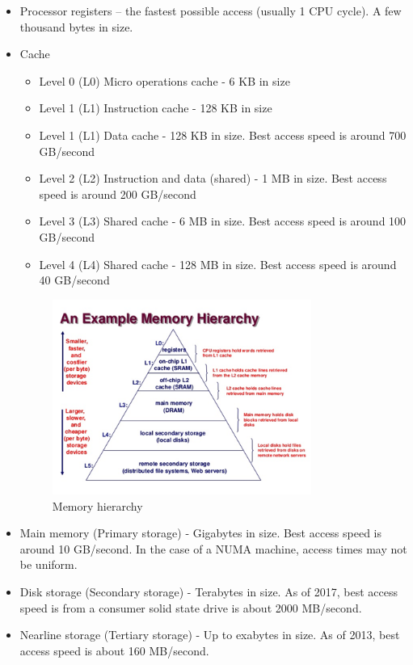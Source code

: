 \documentclass[11pt, conference, onecolumn]{IEEEtran}
\begin{document}
\begin{itemize}
	\item Processor registers – the fastest possible access (usually 1 CPU cycle). A few thousand bytes in size.
	\item Cache
		\begin{itemize}
			\item Level 0 (L0) Micro operations cache - 6 KB  in size
        			\item Level 1 (L1) Instruction cache - 128 KB in size
        			\item Level 1 (L1) Data cache - 128 KB in size. Best access speed is around 700 GB/second
        			\item Level 2 (L2) Instruction and data (shared) - 1 MB in size. Best access speed is around 200 GB/second
        			\item Level 3 (L3) Shared cache - 6 MB in size. Best access speed is around 100 GB/second
        			\item Level 4 (L4) Shared cache - 128 MB in size. Best access speed is around 40 GB/second
		\end{itemize}
\begin{figure}
		\begin{center}
		\includegraphics[width=0.8\textwidth]{memory.png}
		\caption {Memory hierarchy}
		\end{center}	
	\end{figure}
	\item Main memory (Primary storage) - Gigabytes in size. Best access speed is around 10 GB/second. In the case of a NUMA machine, access times may not be uniform.
	\item Disk storage (Secondary storage) - Terabytes in size. As of 2017, best access speed is from a consumer solid state drive is about 2000 MB/second.
	\item Nearline storage (Tertiary storage) - Up to exabytes in size. As of 2013, best access speed is about 160 MB/second.
\end{itemize}
\end{document}
